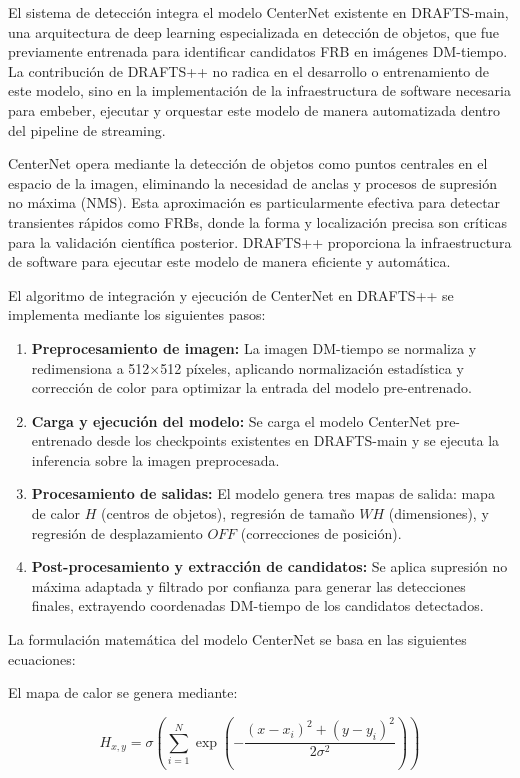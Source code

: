 El sistema de detección integra el modelo CenterNet existente en DRAFTS-main, una arquitectura de deep learning especializada en detección de objetos, que fue previamente entrenada para identificar candidatos FRB en imágenes DM-tiempo. La contribución de DRAFTS++ no radica en el desarrollo o entrenamiento de este modelo, sino en la implementación de la infraestructura de software necesaria para embeber, ejecutar y orquestar este modelo de manera automatizada dentro del pipeline de streaming.

CenterNet opera mediante la detección de objetos como puntos centrales en el espacio de la imagen, eliminando la necesidad de anclas y procesos de supresión no máxima (NMS). Esta aproximación es particularmente efectiva para detectar transientes rápidos como FRBs, donde la forma y localización precisa son críticas para la validación científica posterior. DRAFTS++ proporciona la infraestructura de software para ejecutar este modelo de manera eficiente y automática.

El algoritmo de integración y ejecución de CenterNet en DRAFTS++ se implementa mediante los siguientes pasos:

\begin{enumerate}
    \item \textbf{Preprocesamiento de imagen:} La imagen DM-tiempo se normaliza y redimensiona a 512×512 píxeles, aplicando normalización estadística y corrección de color para optimizar la entrada del modelo pre-entrenado.
    \item \textbf{Carga y ejecución del modelo:} Se carga el modelo CenterNet pre-entrenado desde los checkpoints existentes en DRAFTS-main y se ejecuta la inferencia sobre la imagen preprocesada.
    \item \textbf{Procesamiento de salidas:} El modelo genera tres mapas de salida: mapa de calor $H$ (centros de objetos), regresión de tamaño $WH$ (dimensiones), y regresión de desplazamiento $OFF$ (correcciones de posición).
    \item \textbf{Post-procesamiento y extracción de candidatos:} Se aplica supresión no máxima adaptada y filtrado por confianza para generar las detecciones finales, extrayendo coordenadas DM-tiempo de los candidatos detectados.
\end{enumerate}

La formulación matemática del modelo CenterNet se basa en las siguientes ecuaciones:

El mapa de calor se genera mediante:

\[
H_{x,y} = \sigma\left(\sum_{i=1}^{N} \exp\left(-\frac{(x - x_i)^2 + (y - y_i)^2}{2\sigma^2}\right)\right)
\]

